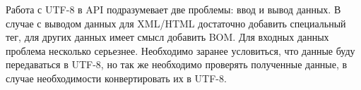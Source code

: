Работа с UTF-8 в API подразумевает две проблемы: ввод и вывод данных. В случае с выводом данных для XML/HTML достаточно добавить специальный тег, для других данных имеет смысл добавить BOM. Для входных данных проблема несколько серьезнее. Необходимо заранее  условиться, что данные буду передаваться в UTF-8, но так же необходимо проверять полученные данные, в случае необходимости конвертировать их в UTF-8.












 
 
 
 
 
 
 
 
 
 
 
 
 
 
 
 
 
 
 
 
 
 
 
 
 
 
 
 
 
 
 
 
 
 
 
 
 
 
 
 
 
 
 
 
 
 \clearpage

 
